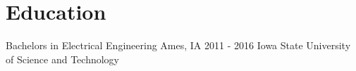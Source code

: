 \documentclass[]{bergman-cv} %
\begin{document}
\section{Education}
\begin{entrylist}
\entryFourItem
{Bachelors in Electrical Engineering}
{Ames, IA}
{2011 - 2016}
{Iowa State University of Science and Technology}
\end{entrylist}
%
%
\end{document}
